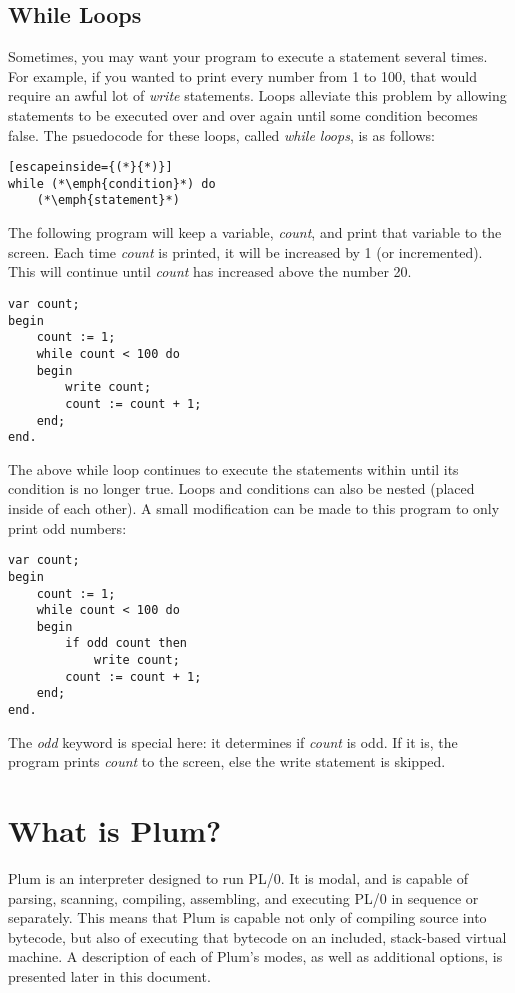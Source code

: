 \documentclass{article}
\begin{document}
\subsection*{While Loops}
Sometimes, you may want your program to execute a statement several times. For example, if you
wanted to print every number from 1 to 100, that would require an awful lot of \emph{write}
statements. Loops alleviate this problem by allowing statements to be executed over and over
again until some condition becomes false. The psuedocode for these loops, called \emph{while
loops}, is as follows:
\begin{lstlisting}[escapeinside={(*}{*)}]
while (*\emph{condition}*) do
    (*\emph{statement}*)
\end{lstlisting}
The following program will keep a variable, \emph{count}, and print that variable to the screen.
Each time \emph{count} is printed, it will be increased by 1 (or incremented). This will
continue until \emph{count} has increased above the number 20.
\begin{lstlisting}
var count;
begin
    count := 1;
    while count < 100 do
    begin
        write count;
        count := count + 1;
    end;
end.
\end{lstlisting}
The above while loop continues to execute the statements within until its condition is
no longer true. Loops and conditions can also be nested (placed inside of each other).
A small modification can be made to this program to only print odd numbers:
\begin{lstlisting}
var count;
begin
    count := 1;
    while count < 100 do
    begin
        if odd count then
            write count;
        count := count + 1;
    end;
end.
\end{lstlisting}
The \emph{odd} keyword is special here: it determines if \emph{count} is odd. If it is,
the program prints \emph{count} to the screen, else the write statement is skipped.

\pagebreak

\section*{What is Plum?}
Plum is an interpreter designed to run PL/0. It is modal, and is capable of parsing,
scanning, compiling, assembling, and executing PL/0 in sequence or separately. This means
that Plum is capable not only of compiling source into bytecode, but also of executing
that bytecode on an included, stack-based virtual machine. A description of each of Plum's
modes, as well as additional options, is presented later in this document.
\end{document}
